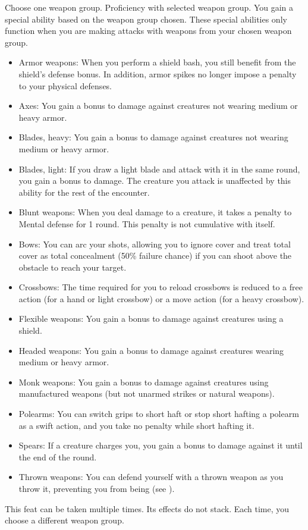 Choose one weapon group.
\featpre Proficiency with selected weapon group.
\featben You gain a special ability based on the weapon group chosen.
These special abilities only function when you are making attacks with weapons from your chosen weapon group.
\begin{itemize}
    \item Armor weapons: When you perform a shield bash, you still benefit from the shield's defense bonus.
        In addition, armor spikes no longer impose a penalty to your physical defenses.
    \item Axes: You gain a  bonus to damage against creatures not wearing medium or heavy armor.
    \item Blades, heavy: You gain a  bonus to damage against creatures not wearing medium or heavy armor.
    \item Blades, light: If you draw a light blade and attack with it in the same round, you gain a  bonus to damage.
        The creature you attack is unaffected by this ability for the rest of the encounter.
    \item Blunt weapons: When you deal damage to a creature, it takes a  penalty to Mental defense for 1 round.
        This penalty is not cumulative with itself.
    \item Bows: You can arc your shots, allowing you to ignore cover and treat total cover as total concealment (50\% failure chance) if you can shoot above the obstacle to reach your target.
    \item Crossbows: The time required for you to reload crossbows is reduced to a free action (for a hand or light crossbow) or a move action (for a heavy crossbow).
    \item Flexible weapons: You gain a  bonus to damage against creatures using a shield.
    \item Headed weapons: You gain a  bonus to damage against creatures wearing medium or heavy armor.
    \item Monk weapons: You gain a  bonus to damage against creatures using manufactured weapons (but not unarmed strikes or natural weapons).
    \item Polearms: You can switch grips to short haft or stop short hafting a polearm as a swift action, and you take no penalty while short hafting it.
    \item Spears: If a creature charges you, you gain a  bonus to damage against it until the end of the round.
    \item Thrown weapons: You can defend yourself with a thrown weapon as you throw it, preventing you from being  (see ).
\end{itemize}
 This feat can be taken multiple times.
Its effects do not stack.
Each time, you choose a different weapon group.

